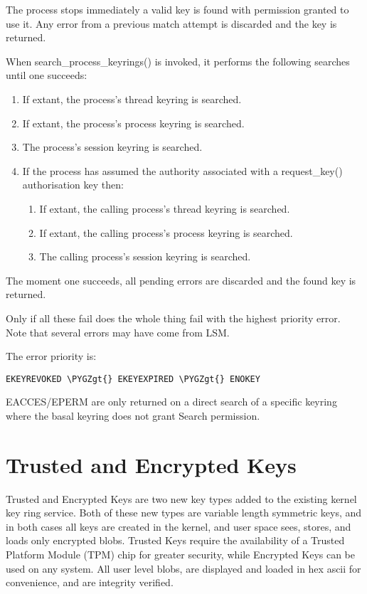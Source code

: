 \documentclass[a4paper,8pt,english]{sphinxmanual}
\def\PYGZgt{\char`\>}
\begin{document}
The process stops immediately a valid key is found with permission granted to
use it.  Any error from a previous match attempt is discarded and the key is
returned.

When search\_process\_keyrings() is invoked, it performs the following searches
until one succeeds:
\begin{enumerate}
\item {} 
If extant, the process's thread keyring is searched.

\item {} 
If extant, the process's process keyring is searched.

\item {} 
The process's session keyring is searched.

\item {} 
If the process has assumed the authority associated with a request\_key()
authorisation key then:
\begin{enumerate}
\item {} 
If extant, the calling process's thread keyring is searched.

\item {} 
If extant, the calling process's process keyring is searched.

\item {} 
The calling process's session keyring is searched.

\end{enumerate}

\end{enumerate}

The moment one succeeds, all pending errors are discarded and the found key is
returned.

Only if all these fail does the whole thing fail with the highest priority
error.  Note that several errors may have come from LSM.

The error priority is:

\begin{Verbatim}[commandchars=\\\{\}]
EKEYREVOKED \PYGZgt{} EKEYEXPIRED \PYGZgt{} ENOKEY
\end{Verbatim}

EACCES/EPERM are only returned on a direct search of a specific keyring where
the basal keyring does not grant Search permission.


\section{Trusted and Encrypted Keys}
\label{security/keys/trusted-encrypted::doc}\label{security/keys/trusted-encrypted:trusted-and-encrypted-keys}
Trusted and Encrypted Keys are two new key types added to the existing kernel
key ring service.  Both of these new types are variable length symmetric keys,
and in both cases all keys are created in the kernel, and user space sees,
stores, and loads only encrypted blobs.  Trusted Keys require the availability
of a Trusted Platform Module (TPM) chip for greater security, while Encrypted
Keys can be used on any system.  All user level blobs, are displayed and loaded
in hex ascii for convenience, and are integrity verified.
\end{document}
